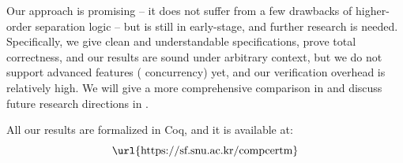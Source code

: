 
Our approach is promising -- it does not suffer from a few drawbacks of higher-order separation logic -- but is still in early-stage, and further research is needed.
Specifically, we give clean and understandable specifications, prove total correctness, and our results are sound under arbitrary context, but we do not support advanced features (\eg{} concurrency) yet, and our verification overhead is relatively high.
We will give a more comprehensive comparison in  and discuss future research directions in .









\bigskip
All our results are formalized in Coq, and it is available at: \[ \text{\url{https://sf.snu.ac.kr/compcertm}} \]

